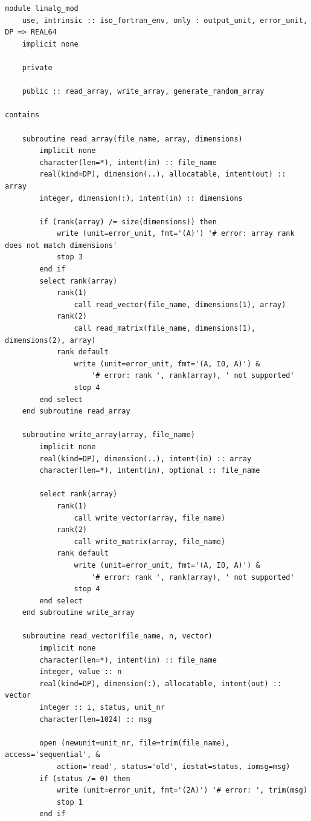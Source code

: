 \begin{verbatim}
module linalg_mod
    use, intrinsic :: iso_fortran_env, only : output_unit, error_unit, DP => REAL64
    implicit none

    private

    public :: read_array, write_array, generate_random_array

contains

    subroutine read_array(file_name, array, dimensions)
        implicit none
        character(len=*), intent(in) :: file_name
        real(kind=DP), dimension(..), allocatable, intent(out) :: array
        integer, dimension(:), intent(in) :: dimensions

        if (rank(array) /= size(dimensions)) then
            write (unit=error_unit, fmt='(A)') '# error: array rank does not match dimensions'
            stop 3
        end if
        select rank(array)
            rank(1)
                call read_vector(file_name, dimensions(1), array)
            rank(2)
                call read_matrix(file_name, dimensions(1), dimensions(2), array)
            rank default
                write (unit=error_unit, fmt='(A, I0, A)') &
                    '# error: rank ', rank(array), ' not supported'
                stop 4
        end select
    end subroutine read_array

    subroutine write_array(array, file_name)
        implicit none
        real(kind=DP), dimension(..), intent(in) :: array
        character(len=*), intent(in), optional :: file_name

        select rank(array)
            rank(1)
                call write_vector(array, file_name)
            rank(2)
                call write_matrix(array, file_name)
            rank default
                write (unit=error_unit, fmt='(A, I0, A)') &
                    '# error: rank ', rank(array), ' not supported'
                stop 4
        end select
    end subroutine write_array

    subroutine read_vector(file_name, n, vector)
        implicit none
        character(len=*), intent(in) :: file_name
        integer, value :: n
        real(kind=DP), dimension(:), allocatable, intent(out) :: vector
        integer :: i, status, unit_nr
        character(len=1024) :: msg

        open (newunit=unit_nr, file=trim(file_name), access='sequential', &
            action='read', status='old', iostat=status, iomsg=msg)
        if (status /= 0) then
            write (unit=error_unit, fmt='(2A)') '# error: ', trim(msg)
            stop 1
        end if


\end{verbatim}
